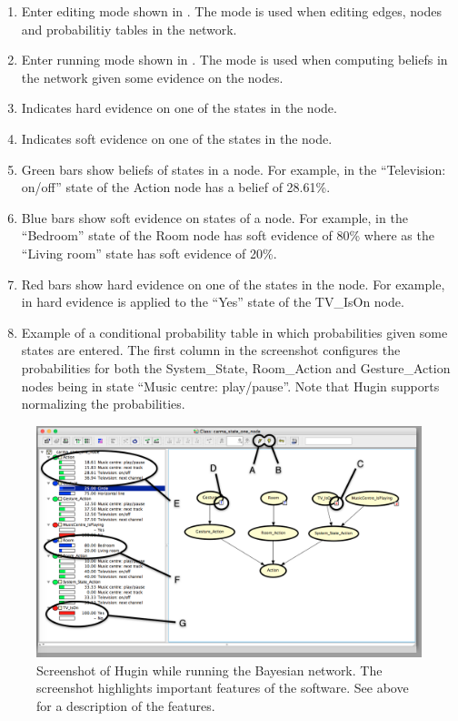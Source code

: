 \begin{enumerate}[label=\Alph*.]
\item Enter editing mode shown in . The mode is used when editing edges, nodes and probabilitiy tables in the network.
\item Enter running mode shown in . The mode is used when computing beliefs in the network given some evidence on the nodes.
\item Indicates hard evidence on one of the states in the node.
\item Indicates soft evidence on one of the states in the node.
\item Green bars show beliefs of states in a node. For example, in  the ``Television: on/off'' state of the Action node has a belief of 28.61\%.
\item Blue bars show soft evidence on states of a node. For example, in  the ``Bedroom'' state of the Room node has soft evidence of 80\% where as the ``Living room'' state has soft evidence of 20\%.
\item Red bars show hard evidence on one of the states in the node. For example, in  hard evidence is applied to the ``Yes'' state of the TV\_IsOn node.
\item Example of a conditional probability table in which probabilities given some states are entered. The first column in the screenshot configures the probabilities for both the System\_State, Room\_Action and Gesture\_Action nodes being in state ``Music centre: play/pause''. Note that Hugin supports normalizing the probabilities.
\end{enumerate}

\begin{figure}[h!]
\centering
\includegraphics[width=\textwidth]{images/hugin-functionality-running}
\caption{Screenshot of Hugin while running the Bayesian network. The screenshot highlights important features of the software. See above for a description of the features.}
\label{fig:design:bayesian-network:hugin-functionality-running}
\end{figure}

